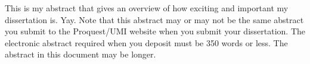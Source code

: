 \documentclass[../main.tex]{subfiles}
\begin{document}
This is my abstract that gives an overview of how exciting and important my dissertation is. Yay.
Note that this abstract may or may not be the same abstract you submit to the Proquest/UMI website when you submit your dissertation. The electronic abstract required when you deposit must be 350 words or less.  The abstract in this document may be longer.
\end{document}
